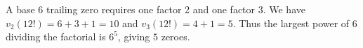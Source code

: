 A base 6 trailing zero requires one factor 2 and one factor 3. We have $v_2(12!)=6+3+1=10$ and $v_3(12!)=4+1=5$. Thus the largest power of 6 dividing the factorial is $6^5$, giving $\boxed5$ zeroes.
